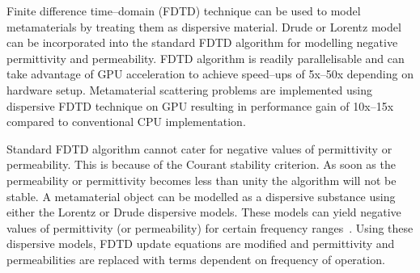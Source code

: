 \documentclass{book}    %
\begin{document}
\begin{paper}

\begin{metaabstract}
Finite difference time--domain (FDTD) technique can be used to model metamaterials by treating them as dispersive material. Drude or Lorentz model can be incorporated into the standard FDTD algorithm for modelling negative permittivity and permeability. FDTD algorithm is readily parallelisable and can take advantage of GPU acceleration to achieve speed--ups of 5x--50x depending on hardware setup. Metamaterial scattering problems are implemented using dispersive FDTD technique on GPU resulting in performance gain of 10x--15x compared to conventional CPU implementation.
\end{metaabstract}
Standard FDTD algorithm cannot cater for negative values of permittivity or permeability. This is because of the Courant stability criterion. As soon as the permeability or permittivity becomes less than unity the algorithm will not be stable. A metamaterial object can be modelled as a dispersive substance using either the Lorentz or Drude dispersive models. These models can yield negative values of permittivity (or permeability) for certain frequency ranges~\cite{NumericalFDTD-Sibel}. Using these dispersive models, FDTD update equations are modified and permittivity and permeabilities are replaced with terms dependent on frequency of operation.


\end{paper}
\end{document}
